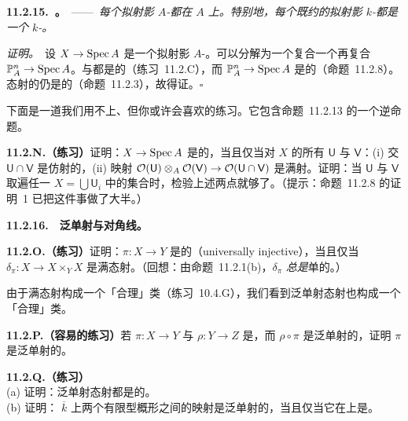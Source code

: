 \textbf{11.2.15.\ \trhCorollary{}。}\ ——\ \emph{每个拟射影 $A$-\trScheme{}都在 $A$ 上\trSeparated。特别地，每个既约的拟射影 $k$-\trScheme{}都是一个 $k$-\trVariety。}

\emph{证明。}\ 设 $X\to\operatorname{Spec} A$ 是一个拟射影 $A$-\trScheme。\trStructureMorphism{}可以分解为一个\trOpenEmbedding{}复合一个\trClosedEmbedding{}再复合 $\mathbb{P}^n_A\to\operatorname{Spec} A$。\trOpenEmbedding{}与\trClosedEmbedding{}都是\trSeparated{}的（\mbox{练习~11.2.C}），而 $\mathbb{P}^n_A\to\operatorname{Spec} A$ 是\trSeparated{}的（命题~11.2.8）。\trSeparated{}态射的\trComposition{}仍是\trSeparated{}的（命题~11.2.3），故得证。\hfill$\square$

下面是一道我们用不上、但你或许会喜欢的练习。它包含命题~11.2.13 的一个逆命题。

\textbf{11.2.N.（练习）}\quad 证明：$X\to\operatorname{Spec} A$ 是\trSeparated{}的，当且仅当对 $X$ 的所有\trAffine\trOpenSubset{} $\mathsf{U}$ 与 $\mathsf{V}$：(i) 交 $\mathsf{U}\cap\mathsf{V}$ 是仿射的，(ii) 映射 $\mathcal{O}(\mathsf{U})\otimes_A\mathcal{O}(\mathsf{V})\to\mathcal{O}(\mathsf{U}\cap\mathsf{V})$ 是满射。证明：当 $\mathsf{U}$ 与 $\mathsf{V}$ 取遍任一\trAffine\trCover{} $X=\bigcup\mathsf{U}_i$ 中的集合时，检验上述两点就够了。（提示：命题~11.2.8 的证明~1 已把这件事做了大半。）

\textbf{11.2.16.}\ \extrahard\ \textbf{泛单射\trMorphism{}与对角线。}

\textbf{11.2.O.（练习）}\quad 证明：$\pi\colon X\to Y$ 是\textbf{\trUniversallyInjective}的（universally injective），当且仅当\trDiagonalMorphism{} $\delta_\pi\colon X\to X\times_Y X$ 是满态射。（回想：由命题~11.2.1(b)，$\delta_\pi$ \emph{总是}单的。）

由于满态射构成一个「合理」类（\mbox{练习~10.4.G}），我们看到泛单射态射也构成一个「合理」类。

\textbf{11.2.P.（容易的练习）}\quad 若 $\pi\colon X\to Y$ 与 $\rho\colon Y\to Z$ 是\trMorphism，而 $\rho\circ\pi$ 是泛单射的，证明 $\pi$ 是泛单射的。

\textbf{11.2.Q.（练习）}\\
(a) 证明：泛单射态射都是\trSeparated{}的。\\
(b) 证明：\trAlgClosedField{} $\overline{k}$ 上两个有限型概形之间的映射是泛单射的，当且仅当它在\trClosedPoint{}上是\trInjectiveMap。
